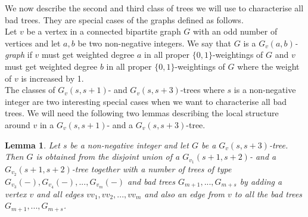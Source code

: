 \documentclass[
final,
 nomarks,
]{dmtcs-episciences}
\newtheorem{lemma}[theorem]{Lemma}
\theoremstyle{definition}
\begin{document}
\noindent We now describe the second and third class of trees we will use to characterise all bad trees. They are special cases of the graphs defined as follows. \\ 
Let $v$ be a vertex in a connected bipartite graph $G$ with an odd number of vertices and let $a,b$ be two non-negative integers. We say that $G$ is a $G_v(a,b)$\textit{-graph} if $v$ must get weighted degree $a$ in all proper $\{0,1\}$-weightings of $G$ and $v$ must get weighted degree $b$ in all proper $\{0,1\}$-weightings of $G$ where the weight of $v$ is increased by 1. \\
The classes of $G_v(s,s+1)$- and $G_v(s,s+3)$-trees where $s$ is a non-negative integer are two interesting special cases when we want to characterise all bad trees. We will need the following two lemmas describing the local structure around $v$ in a $G_v(s,s+1)$- and a $G_v(s,s+3)$-tree.
\begin{lemma} \label{lem:x,x+3tree}
Let $s$ be a non-negative integer and let $G$ be a $G_v(s,s+3)$-tree. Then $G$ is obtained from the disjoint union of a $G_{v_1}(s+1,s+2)$- and a $G_{v_2}(s+1,s+2)$-tree together with a number of trees of type $G_{v_3}(-), G_{v_4}(-),...,G_{v_m}(-) $ and bad trees $G_{m+1},...,G_{m+s}$  by adding a vertex $v$ and all edges $vv_1, vv_2, ..., vv_m$ and also an edge from $v$ to all the bad trees $G_{m+1},...,G_{m+s}$.
\end{lemma}
\end{document}
